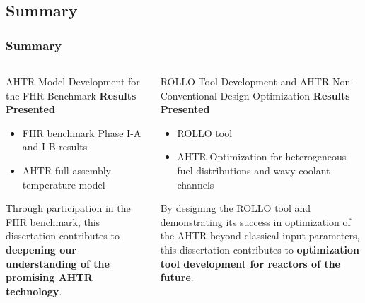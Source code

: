 \subsection*{Summary}
\begin{frame}
    \frametitle{Summary}
    \begin{columns}[t]
        \begin{column}{0.5\linewidth}
            \begin{block}{AHTR Model Development for the FHR Benchmark}
                \textbf{Results Presented} 
                \begin{itemize}
                    \item FHR benchmark Phase I-A and I-B results
                    \item AHTR full assembly temperature model 
                \end{itemize}

                Through participation in the FHR benchmark, this dissertation contributes to 
                \textbf{deepening our understanding of the promising \gls{AHTR} technology}.
            \end{block}
        \end{column}
        \begin{column}{0.5\linewidth}
            \begin{block}{ROLLO Tool Development and AHTR Non-Conventional Design Optimization}
                \textbf{Results Presented}
                \begin{itemize}
                    \item \acrfull{ROLLO} tool 
                    \item AHTR Optimization for heterogeneous fuel distributions and wavy 
                    coolant channels 
                \end{itemize}
                
                By designing the ROLLO tool and demonstrating its success in 
                optimization of the \gls{AHTR} beyond classical input parameters, this dissertation 
                contributes to \textbf{optimization tool development for reactors of the future}.
            \end{block}
        \end{column}
    \end{columns}
\end{frame}

